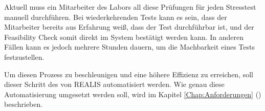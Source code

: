 Aktuell muss ein Mitarbeiter des Labors all diese Prüfungen für jeden Stresstest manuell durchführen. Bei wiederkehrenden Tests kann es sein, dass der Mitarbeiter bereits aus Erfahrung weiß, dass der Test durchführbar ist, und der Feasibility Check somit direkt im System bestätigt werden kann. In anderen Fällen kann es jedoch mehrere Stunden dauern, um die Machbarkeit eines Tests festzustellen.

Um diesen Prozess zu beschleunigen und eine höhere Effizienz zu erreichen, soll dieser Schritt des  von \gls{REALIS} automatisiert werden. Wie genau diese Automatisierung umgesetzt werden soll, wird im Kapitel \ref{Chap:Anforderungen} () beschrieben.
